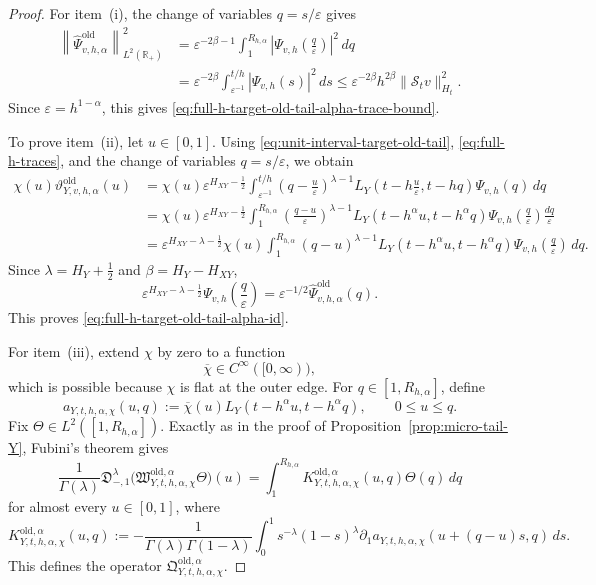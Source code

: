 \documentclass[11pt,a4paper]{amsart}
\theoremstyle{plain}
\theoremstyle{definition}
\theoremstyle{remark}
\newcommand{\R}{\mathbb{R}}
\begin{document}
\begin{proof}
For item~(i), the change of variables \(q=s/\varepsilon\) gives
\begin{align*}
\left\|
\widehat\Psi_{v,h,\alpha}^{\mathrm{old}}
\right\|_{L^2(\R_+)}^2
&=
\varepsilon^{-2\beta-1}
\int_1^{R_{h,\alpha}}
\left|
\Psi_{v,h}\!\left(\frac{q}{\varepsilon}\right)
\right|^2\,dq\\
&=
\varepsilon^{-2\beta}
\int_{\varepsilon^{-1}}^{t/h}
\left|
\Psi_{v,h}(s)
\right|^2\,ds
\le
\varepsilon^{-2\beta}h^{2\beta}\|\mathcal S_t v\|_{H_t}^2.
\end{align*}
Since \(\varepsilon=h^{1-\alpha}\), this gives
\eqref{eq:full-h-target-old-tail-alpha-trace-bound}.

To prove item~(ii), let \(u\in[0,1]\). Using \eqref{eq:unit-interval-target-old-tail},
\eqref{eq:full-h-traces}, and the change of variables \(q=s/\varepsilon\), we obtain
\begin{align*}
\chi(u)\vartheta_{Y,v,h,\alpha}^{\mathrm{old}}(u)
&=
\chi(u)\varepsilon^{H_{XY}-\frac12}
\int_{\varepsilon^{-1}}^{t/h}
\left(
q-\frac{u}{\varepsilon}
\right)^{\lambda-1}
L_Y\!\left(t-h\frac{u}{\varepsilon},t-hq\right)
\Psi_{v,h}(q)\,dq\\
&=
\chi(u)\varepsilon^{H_{XY}-\frac12}
\int_1^{R_{h,\alpha}}
\left(
\frac{q-u}{\varepsilon}
\right)^{\lambda-1}
L_Y(t-h^\alpha u,t-h^\alpha q)
\Psi_{v,h}\!\left(\frac{q}{\varepsilon}\right)
\frac{dq}{\varepsilon}\\
&=
\varepsilon^{H_{XY}-\lambda-\frac12}
\chi(u)
\int_1^{R_{h,\alpha}}
(q-u)^{\lambda-1}
L_Y(t-h^\alpha u,t-h^\alpha q)
\Psi_{v,h}\!\left(\frac{q}{\varepsilon}\right)\,dq.
\end{align*}
Since \(\lambda=H_Y+\tfrac12\) and \(\beta=H_Y-H_{XY}\),
\[
\varepsilon^{H_{XY}-\lambda-\frac12}
\Psi_{v,h}\!\left(\frac{q}{\varepsilon}\right)
=
\varepsilon^{-1/2}\widehat\Psi_{v,h,\alpha}^{\mathrm{old}}(q).
\]
This proves \eqref{eq:full-h-target-old-tail-alpha-id}.

For item~(iii), extend \(\chi\) by zero to a function
\[
\overline\chi\in C^\infty([0,\infty)),
\]
which is possible because \(\chi\) is flat at the outer edge. For \(q\in[1,R_{h,\alpha}]\), define
\[
a_{Y,t,h,\alpha,\chi}(u,q)
:=
\overline\chi(u)L_Y(t-h^\alpha u,t-h^\alpha q),
\qquad 0\le u\le q.
\]
Fix \(\Theta\in L^2([1,R_{h,\alpha}])\). Exactly as in the proof of
Proposition~\ref{prop:micro-tail-Y}, Fubini's theorem gives
\[
\frac{1}{\Gamma(\lambda)}
\mathfrak D_{-,1}^{\lambda}
\bigl(
\mathfrak W_{Y,t,h,\alpha,\chi}^{\mathrm{old},\alpha}\Theta
\bigr)(u)
=
\int_1^{R_{h,\alpha}}
K_{Y,t,h,\alpha,\chi}^{\mathrm{old},\alpha}(u,q)\Theta(q)\,dq
\]
for almost every \(u\in[0,1]\), where
\[
K_{Y,t,h,\alpha,\chi}^{\mathrm{old},\alpha}(u,q)
:=
-
\frac{1}{\Gamma(\lambda)\Gamma(1-\lambda)}
\int_0^1
s^{-\lambda}(1-s)^\lambda
\partial_1 a_{Y,t,h,\alpha,\chi}(u+(q-u)s,q)\,ds.
\]
This defines the operator
\(\mathfrak Q_{Y,t,h,\alpha,\chi}^{\mathrm{old},\alpha}\).


\end{proof}
\end{document}
